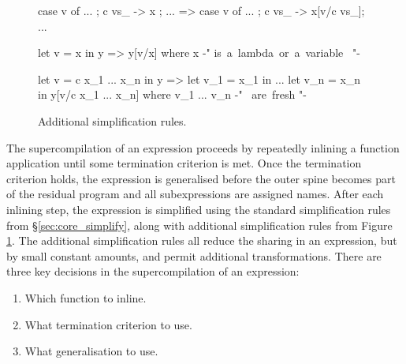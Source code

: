 \begin{figure}
\begin{code}
case v of {... ; c vs_ -> x ; ...}
    => case v of {... ; c vs_ -> x[v/c vs_]; ...}

let v = x in y
    => y[v/x]
    where x {-" \hbox{is a lambda or a variable } "-}

let v = c x_1 ... x_n in y
    =>  let v_1 = x_1 in
        ...
        let v_n = x_n in
        y[v/c x_1 ... x_n]
    where v_1 ... v_n {-" \hbox{ are fresh} "-}
\end{code}
\caption{Additional simplification rules.}
\label{fig:simplify}
\end{figure}

The supercompilation of an expression proceeds by repeatedly inlining a function application until some termination criterion is met. Once the termination criterion holds, the expression is generalised before the outer spine becomes part of the residual program and all subexpressions are assigned names. After each inlining step, the expression is simplified using the standard simplification rules from \S\ref{sec:core_simplify}, along with additional simplification rules from Figure \ref{fig:simplify}. The additional simplification rules all reduce the sharing in an expression, but by small constant amounts, and permit additional transformations. There are three key decisions in the supercompilation of an expression:

\begin{enumerate}
\item Which function to inline.
\item What termination criterion to use.
\item What generalisation to use.
\end{enumerate}


